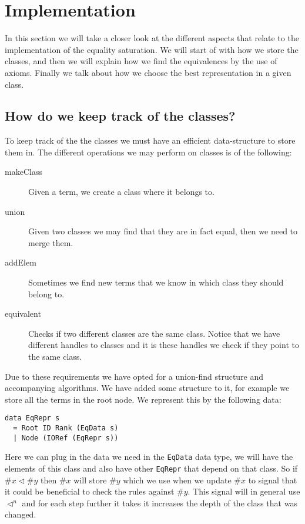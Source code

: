 
\section{Implementation}
In this section we will take a closer look at the different aspects that relate
to the implementation of the equality saturation. We will start of with how
we store the classes, and then we will explain how we find the equivalences by 
the use of axioms. Finally we talk about how we choose the best representation in
a given class.
\subsection{How do we keep track of the classes?}
To keep track of the the classes we must have an efficient data-structure to store
them in. The different operations we may perform on classes is of the following:

\begin{description}
  \item[makeClass] Given a term, we create a class where it belongs to.
  \item[union]     Given two classes we may find that they are in fact equal, then
                   we need to merge them.
  \item[addElem]   Sometimes we find new terms that we know in which class they
                   should belong to.
  \item[equivalent] Checks if two different classes are the same class. Notice
                    that we have different handles to classes and it is these
                    handles we check if they point to the same class.
\end{description}

Due to these requirements we have opted for a union-find structure and accompanying
algorithms. We have added some structure to it, for example we store all the terms
in the root node. We represent this by the following data:

\begin{verbatim}
data EqRepr s
  = Root ID Rank (EqData s)
  | Node (IORef (EqRepr s))
\end{verbatim}

Here we can plug in the data we need in the \verb|EqData| data type, we will have
the elements of this class and also have other \verb|EqRepr| that depend on that
class. So if $\#x \lhd \#y$ then $\#x$ will store $\#y$ which we use when we update
$\#x$ to signal that it could be beneficial to check the rules against $\#y$. This
signal will in general use $\lhd^n$ and for each step further it takes it increases
the depth of the class that was changed.

